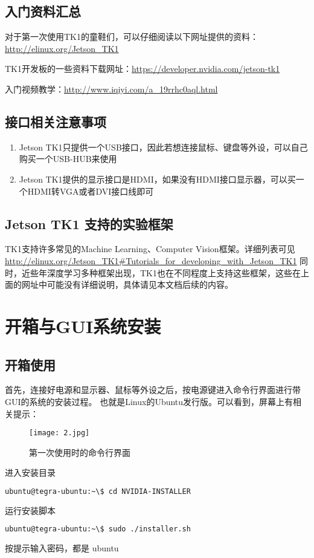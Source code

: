 \documentclass[openany]{ctexbook}
\newcommand{\warn}[1] {\fcolorbox{red!20}{red!20} {\color{red} #1}}
\begin{document}
\section{入门资料汇总}
对于第一次使用TK1的童鞋们，可以仔细阅读以下网址提供的资料：\url{http://elinux.org/Jetson_TK1}

TK1开发板的一些资料下载网址：\url{https://developer.nvidia.com/jetson-tk1}

入门视频教学：\url{http://www.iqiyi.com/a_19rrhc0aql.html}

\section{接口相关注意事项}
\begin{enumerate}
  \item Jetson TK1只提供一个USB接口，因此若想连接鼠标、键盘等外设，可以自己购买一个USB-HUB来使用
  \item Jetson TK1提供的显示接口是HDMI，如果没有HDMI接口显示器，可以买一个HDMI转VGA或者DVI接口线即可
\end{enumerate}

\section{Jetson TK1 支持的实验框架}
TK1支持许多常见的Machine Learning、Computer Vision框架。详细列表可见\url{http://elinux.org/Jetson_TK1#Tutorials_for_developing_with_Jetson_TK1}
同时，近些年深度学习多种框架出现，TK1也在不同程度上支持这些框架，这些在上面的网址中可能没有详细说明，具体请见本文档后续的内容。


\chapter{开箱与GUI系统安装}
\section{开箱使用}
首先，连接好电源和显示器、鼠标等外设之后，按电源键进入命令行界面进行带GUI的系统的安装过程。
也就是Linux的Ubuntu发行版。可以看到，屏幕上有相关提示：
\begin{figure}[h]
  \centering
  \texttt{[image: 2.jpg]}
  \caption{第一次使用时的命令行界面}
\end{figure}

进入安装目录
{\setmainfont{Courier New Bold}                          %
\begin{lstlisting}[language=bash]
ubuntu@tegra-ubuntu:~\$ cd NVIDIA-INSTALLER
\end{lstlisting}}
运行安装脚本
{\setmainfont{Courier New Bold}                          %
\begin{lstlisting}[language=bash]
ubuntu@tegra-ubuntu:~\$ sudo ./installer.sh
\end{lstlisting}}
按提示输入密码，都是\warn{ubuntu}
\end{document}
